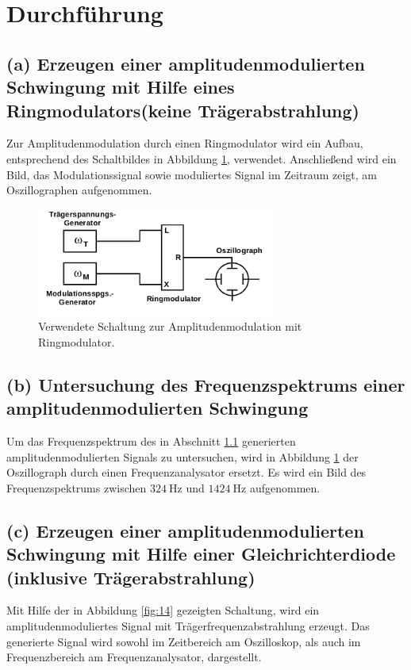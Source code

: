 \newpage
\section{Durchführung}
\label{sec:Durchführung}

\FloatBarrier
\subsection{(a) Erzeugen einer amplitudenmodulierten Schwingung mit
Hilfe eines Ringmodulators(keine Trägerabstrahlung)}
\label{subsec:durchfuehrung_a}
Zur Amplitudenmodulation durch einen Ringmodulator wird ein Aufbau,
entsprechend des Schaltbildes in Abbildung \ref{fig:13}, verwendet.
Anschließend wird ein Bild, das Modulationssignal sowie moduliertes
Signal im Zeitraum zeigt, am Oszillographen aufgenommen.

\begin{figure}
  \centering
  \includegraphics[width=0.7\textwidth]{figures/a_d.png}
  \caption{Verwendete Schaltung zur Amplitudenmodulation mit Ringmodulator.\cite{sample}}
  \label{fig:13}
\end{figure}

\FloatBarrier
\subsection{(b) Untersuchung des Frequenzspektrums einer
amplitudenmodulierten Schwingung}
\label{subsec:durchfuehrung_b}
Um das Frequenzspektrum des in Abschnitt \ref{subsec:durchfuehrung_a} generierten
amplitudenmodulierten Signals zu untersuchen, wird in Abbildung
\ref{fig:13} der Oszillograph durch einen Frequenzanalysator ersetzt.
Es wird ein Bild des Frequenzspektrums zwischen $\SI{324}{\hertz}$ und $\SI{1424}{\hertz}$
aufgenommen.

\FloatBarrier
\subsection{(c) Erzeugen einer amplitudenmodulierten Schwingung
mit Hilfe einer Gleichrichterdiode (inklusive Trägerabstrahlung)}
\label{subsec:durchfuehrung_c}
Mit Hilfe der in Abbildung \ref{fig:14} gezeigten Schaltung,
wird ein amplitudenmoduliertes Signal mit Trägerfrequenzabstrahlung erzeugt.
Das generierte Signal wird sowohl im Zeitbereich am Oszilloskop, als auch
im Frequenzbereich am Frequenzanalysator, dargestellt.

